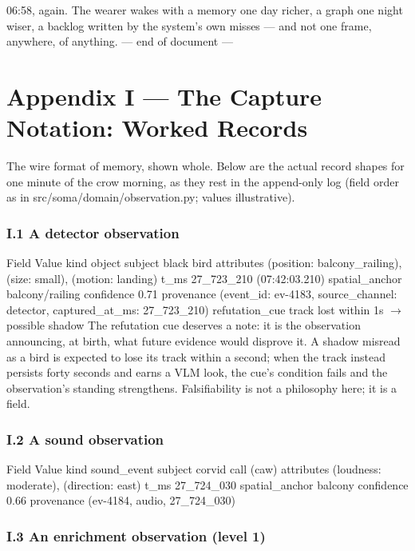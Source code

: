 06:58, again. The wearer wakes with a memory one day richer, a graph one night wiser, a backlog written by the system's own misses --- and not one frame, anywhere, of anything. --- end of document ---

\chapter*{Appendix I --- The Capture Notation: Worked Records}\label{appendix-i-the-capture-notation-worked-records}

The wire format of memory, shown whole. Below are the actual record shapes for one minute of the crow morning, as they rest in the append-only log (field order as in src/soma/domain/observation.py; values illustrative).

\subsection{I.1 A detector observation}\label{i.1-a-detector-observation}

Field Value kind object subject black bird attributes (position: balcony\_railing), (size: small), (motion: landing) t\_ms 27\_723\_210 (07:42:03.210) spatial\_anchor balcony/railing confidence 0.71 provenance (event\_id: ev-4183, source\_channel: detector, captured\_at\_ms: 27\_723\_210) refutation\_cue track lost within 1s \(\rightarrow\) possible shadow The refutation cue deserves a note: it is the observation announcing, at birth, what future evidence would disprove it. A shadow misread as a bird is expected to lose its track within a second; when the track instead persists forty seconds and earns a VLM look, the cue's condition fails and the observation's standing strengthens. Falsifiability is not a philosophy here; it is a field.

\subsection{I.2 A sound observation}\label{i.2-a-sound-observation}

Field Value kind sound\_event subject corvid call (caw) attributes (loudness: moderate), (direction: east) t\_ms 27\_724\_030 spatial\_anchor balcony confidence 0.66 provenance (ev-4184, audio, 27\_724\_030)

\subsection{I.3 An enrichment observation (level 1)}\label{i.3-an-enrichment-observation-level-1}

